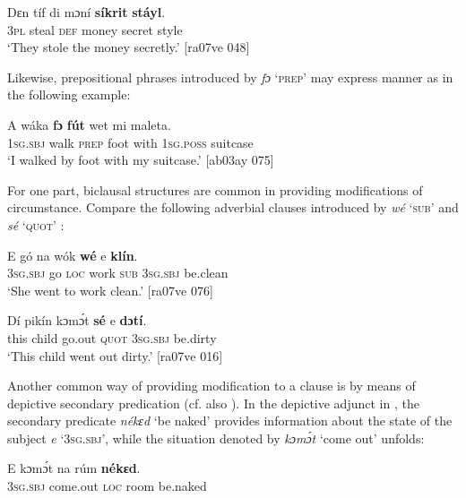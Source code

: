 \ea%
    \label{ex:key:880}
    \gll Dɛn    tíf    di  mɔní  \textbf{síkrit}  \textbf{stáyl}.\\
\textsc{3pl}    steal  \textsc{def}  money  secret  style\\

\glt ‘They stole the money secretly.’ [ra07ve 048]
\z

Likewise, prepositional phrases introduced by \textit{fɔ} ‘\textsc{prep}’ may express manner as in the following example: 


\ea%
    \label{ex:key:881}
    \gll A    wáka  \textbf{fɔ}  \textbf{fút}    wet    mi    maleta.\\
\textsc{1sg.sbj}  walk  \textsc{prep}  foot    with    \textsc{1sg.poss}  suitcase\\

\glt ‘I walked by foot with my suitcase.’ [ab03ay 075]
\z

For one part, biclausal structures are common in providing modifications of circumstance. Compare the following adverbial clauses introduced by \textit{wé} ‘\textsc{sub}’  and \textit{sé} ‘\textsc{quot}’ : 


\ea%
    \label{ex:key:882}
    \gll E    gó  na  wók    \textbf{wé}  e    \textbf{klín}.\\
\textsc{3sg.sbj}  go  \textsc{loc}  work  \textsc{sub}  \textsc{3sg.sbj}  be.clean\\

\glt ‘She went to work clean.’ [ra07ve 076]
\z


\ea%
    \label{ex:key:883}
    \gll Dí  pikín  kɔmɔ́t  \textbf{sé} e\textbf{    dɔtí}.\\
this  child  go.out  \textsc{quot}    \textsc{3sg.sbj}  be.dirty\\

\glt ‘This child went out dirty.’ [ra07ve 016]
\z

Another common way of providing modification to a clause is by means of depictive secondary predication (cf. also ). In the depictive adjunct in , the secondary predicate \textit{nékɛd} ‘be naked’ provides information about the state of the subject \textit{e} \textsc{‘3sg.sbj’,} while the situation denoted by \textit{kɔmɔ́t} ‘come out’ unfolds:


\ea%
    \label{ex:key:884}
    \gll E    kɔmɔ́t    na  rúm    \textbf{nékɛd}.\\
\textsc{3sg.sbj}  come.out  \textsc{loc}  room  be.naked\\


